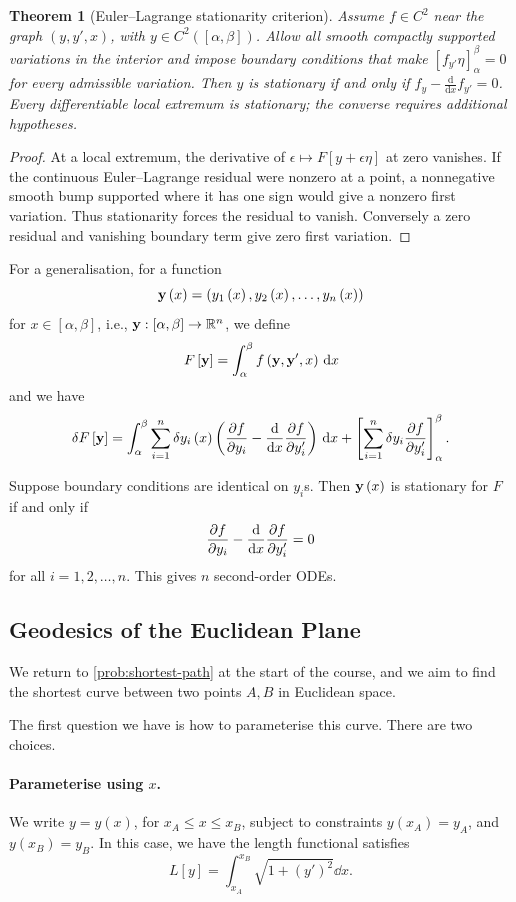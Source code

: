 \documentclass[11pt]{article}
\numberwithin{equation}{section}
\newtheorem{theorem}{Theorem}[section]
\theoremstyle{definition}
\theoremstyle{remark}
\newcommand{\pqty}[1]{\left(#1\right)}
\newcommand{\bqty}[1]{\left[#1\right]}
\newcommand{\ccintv}[2]{[#1,#2]}
\newcommand{\functiondomain}[3]{#1:#2\to #3}
\newcommand{\RR}{\mathbb{R}}
\begin{document}
\begin{theorem}[Euler--Lagrange stationarity criterion]\label{variation-unit-0043}
Assume \(f\in C^2\) near the graph \((y,y',x)\), with \(y\in C^2([\alpha,\beta])\).
Allow all smooth compactly supported variations in the interior and impose boundary
conditions that make \([f_{y'}\eta]_\alpha^\beta=0\) for every admissible variation.
Then \(y\) is stationary if and only if
\(f_y-\frac{\mathrm d}{\mathrm dx}f_{y'}=0\). Every differentiable local extremum
is stationary; the converse requires additional hypotheses.
\end{theorem}
\begin{proof}
At a local extremum, the derivative of \(\epsilon\mapsto F[y+\epsilon\eta]\)
at zero vanishes. If the continuous Euler--Lagrange residual were nonzero at a point,
a nonnegative smooth bump supported where it has one sign would give a nonzero
first variation. Thus stationarity forces the residual to vanish. Conversely a zero
residual and vanishing boundary term give zero first variation.
\end{proof}

For a generalisation, for a function
\[
    \vb{y} \pqty{x} = \pqty{y_1 \pqty{x}, y_2 \pqty{x}, \ldots, y_n \pqty{x}}
\]
for \(x \in \ccintv{\alpha}{\beta}\), i.e., \(\functiondomain{\vb{y}}{\ccintv{\alpha}{\beta}}{\RR^n}\), we define
\[
    F\bqty{\vb{y}} = \int_{\alpha}^{\beta} f\pqty{\vb{y}, \vb{y}', x} \dd{x}
\]
and we have
\[
    \var{F\bqty{\vb{y}}} = \int_{\alpha}^{\beta} \sum_{i = 1}^{n} \var{y_i \pqty{x}} \pqty{\pdv{f}{y_i} - \dv{x} \pdv{f}{y'_i}} \dd{x} + \bqty{\sum_{i = 1}^{n} \var{y_i} \pdv{f}{y_i'}}_{\alpha}^{\beta}.
\]

Suppose boundary conditions are identical on \(y_i\)s. Then \(\vb{y}\pqty{x}\) is stationary for \(F\) if and only if
\[
    \pdv{f}{y_i} - \dv{x} \pdv{f}{y_i'} = 0
\]
for all \(i = 1, 2, \ldots, n\). This gives \(n\) second-order ODEs.

\subsection{Geodesics of the Euclidean Plane}

We return to \autoref{prob:shortest-path} at the start of the course, and we aim to find the shortest curve between two points \(A, B\) in Euclidean space.

The first question we have is how to parameterise this curve. There are two choices.

\paragraph{Parameterise using \(x\).} We write \(y = y\pqty{x}\), for \(x_A \leq x \leq x_B\), subject to constraints \(y\pqty{x_A} = y_A\), and \(y\pqty{x_B} = y_B\). In this case, we have the length functional satisfies
    \[
        L\bqty{y} = \int_{x_A}^{x_B} \sqrt{1 + \pqty{y'}^2} \dd{x}.
    \]
\end{document}
